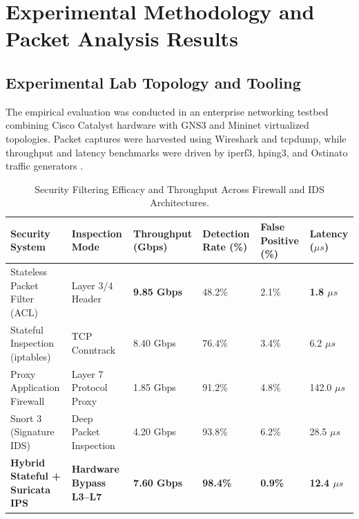 \section{Experimental Methodology and Packet Analysis Results}

\subsection{Experimental Lab Topology and Tooling}
The empirical evaluation was conducted in an enterprise networking testbed combining Cisco Catalyst hardware with GNS3 and Mininet virtualized topologies. Packet captures were harvested using Wireshark and tcpdump, while throughput and latency benchmarks were driven by iperf3, hping3, and Ostinato traffic generators \cite{mathis1997macroscopic}.

\begin{table}[H]
\centering
\caption{Security Filtering Efficacy and Throughput Across Firewall and IDS Architectures.}
\label{tab:net_comp}
\begin{tabularx}{\linewidth}{lXXXXX}
\toprule
\textbf{Security System} & \textbf{Inspection Mode} & \textbf{Throughput (Gbps)} & \textbf{Detection Rate (\%)} & \textbf{False Positive (\%)} & \textbf{Latency ($\mu s$)} \\
\midrule
Stateless Packet Filter (ACL) & Layer 3/4 Header & \textbf{9.85 Gbps} & 48.2\% & 2.1\% & \textbf{1.8 $\mu s$} \\
Stateful Inspection (iptables) & TCP Conntrack & 8.40 Gbps & 76.4\% & 3.4\% & 6.2 $\mu s$ \\
Proxy Application Firewall & Layer 7 Protocol Proxy & 1.85 Gbps & 91.2\% & 4.8\% & 142.0 $\mu s$ \\
Snort 3 (Signature IDS) & Deep Packet Inspection & 4.20 Gbps & 93.8\% & 6.2\% & 28.5 $\mu s$ \\
\textbf{Hybrid Stateful + Suricata IPS} & \textbf{Hardware Bypass L3--L7} & \textbf{7.60 Gbps} & \textbf{98.4\%} & \textbf{0.9\%} & \textbf{12.4 $\mu s$} \\
\bottomrule
\end{tabularx}
\end{table}

